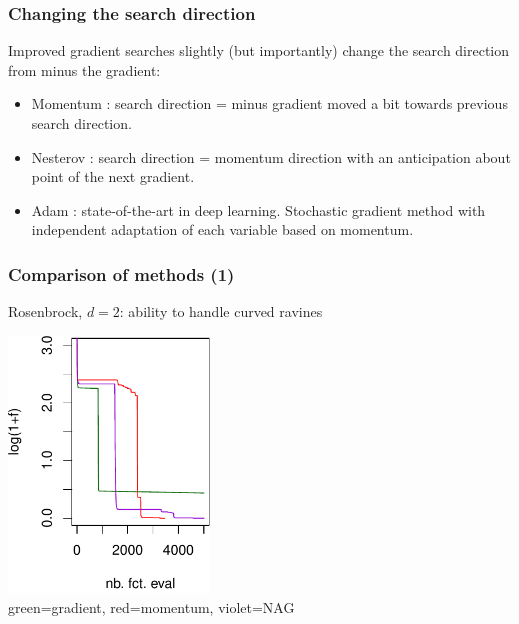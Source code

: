 \documentclass[12pt]{beamer}
\begin{document}
\begin{frame}
\frametitle{Changing the search direction} 
Improved gradient searches slightly (but importantly) change the search direction from minus the gradient:
\begin{itemize}
\item Momentum : search direction = minus gradient moved a bit towards previous search direction.
\item Nesterov \cite{nesterov1983method} : search direction = momentum direction with an anticipation about point of the next gradient.
\item Adam \cite{kingma2014adam} : state-of-the-art in deep learning. Stochastic gradient method with independent adaptation of each variable based on momentum.
\end{itemize}
\end{frame}

\begin{frame}
\frametitle{Comparison of methods (1)} 
Rosenbrock, $d=2$: ability to handle curved ravines
\begin{center}
\includegraphics[width=0.4\textwidth]{rosen_comparison-crop.pdf} \\
green=gradient, red=momentum, violet=NAG
\end{center}
\end{frame}
\end{document}
